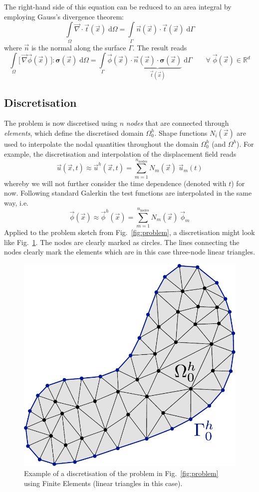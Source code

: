 \documentclass[times,namecite]{goose-article}
\begin{document}
The right-hand side of this equation can be reduced to an area integral by employing Gauss's divergence theorem:
\begin{equation}
  \int\limits_\Omega \vec{\nabla} \cdot \vec{t}(\vec{x}) \; \mathrm{d}\Omega
  =
  \int\limits_\Gamma \vec{n}(\vec{x}) \cdot \vec{t}(\vec{x}) \; \mathrm{d}\Gamma
\end{equation}
where $\vec{n}$ is the normal along the surface $\Gamma$. The result reads
\begin{equation}
\label{eq:static:weak:final}
  \int\limits_\Omega
    \big[\, \vec{\nabla} \vec{\phi}(\vec{x}) \,\big] : \bm{\sigma}(\vec{x}) \;
  \mathrm{d}\Omega
  =
  \int\limits_\Gamma
    \vec{\phi}(\vec{x}) \cdot
    \underbrace{
      \vec{n}(\vec{x}) \cdot \bm{\sigma}(\vec{x})
    }_{
      \vec{t}(\vec{x})
    } \;
  \mathrm{d}\Gamma
  \qquad
  \forall \; \vec{\phi}(\vec{x}) \in \mathbb{R}^d
\end{equation}

\subsection{Discretisation}

The problem is now discretised using $n$ \emph{nodes} that are connected through \emph{elements}, which define the discretised domain $\Omega^h_0$. Shape functions $N_i(\vec{x})$ are used to interpolate the nodal quantities throughout the domain $\Omega^h_0$ (and $\Omega^h$). For example, the discretisation and interpolation of the displacement field reads
\begin{equation}
  \vec{u}(\vec{x},t)
  \approx
  \vec{u}^h(\vec{x},t)
  =
  \sum_{m=1}^{n_\mathrm{nodes}} N_m (\vec{x}) \; \vec{u}_m (t)
\end{equation}
whereby we will not further consider the time dependence (denoted with $t$) for now. Following standard Galerkin the test functions are interpolated in the same way, i.e.\
\begin{equation}
\label{eq:discretisation}
  \vec{\phi}(\vec{x})
  \approx
  \vec{\phi}^h(\vec{x})
  =
  \sum_{m=1}^{n_\mathrm{nodes}} N_m (\vec{x}) \; \vec{\phi}_m
\end{equation}
Applied to the problem sketch from Fig.~\ref{fig:problem}, a discretisation might look like Fig.~\ref{fig:problem:discretised}. The nodes are clearly marked as circles. The lines connecting the nodes clearly mark the elements which are in this case three-node linear triangles.

\begin{figure}[htp]
  \centering
  \includegraphics[width=.25\textwidth]{figures/problem-discretized.pdf}
  \caption{Example of a discretisation of the problem in Fig.~\ref{fig:problem} using Finite Elements (linear triangles in this case).}
  \label{fig:problem:discretised}
\end{figure}
\end{document}
